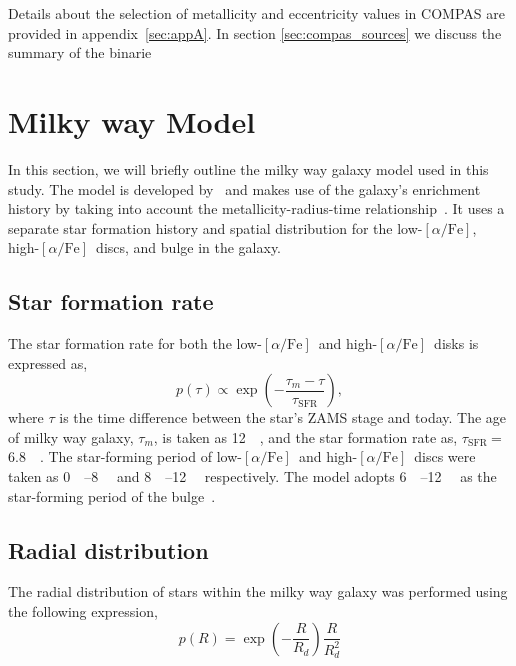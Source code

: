 \documentclass[12pt, journal, onecolumn]{IEEEtran}
\newcommand{\lowalpha}{low-$[\alpha/\text{Fe}]$}
\newcommand{\highalpha}{high-$[\alpha/\text{Fe}]$}
\begin{document}
    Details about the selection of metallicity and eccentricity values in COMPAS are provided in appendix~\ref{sec:appA}. In section \ref{sec:compas_sources} we discuss the summary of the binarie


    \section{Milky way Model}
    \label{sec:milky_way}
    In this section, we will briefly outline the milky way galaxy model used in this study.
    The model is developed by~\cite{wagg2021gravitational} and makes use of the galaxy's enrichment history by taking
    into account the metallicity-radius-time relationship~\cite{Frankel2018}.
    It uses a separate star formation history and spatial distribution for the \lowalpha, \highalpha\ discs, and bulge in the galaxy.

    \subsection{Star formation rate}
    \label{subsec:star_formation_rate}
    The star formation rate for both the \lowalpha\ and \highalpha\ disks is expressed as,
    \begin{equation}
        p(\tau) \propto \exp\left(-\frac{\tau_m - \tau}{\tau_\text{SFR}}\right),
        \label{eq:star_formation_rate_equation}
    \end{equation}
    where $\tau$ is the time difference between the star's ZAMS stage and today.
    The age of milky way galaxy, $\tau_m$, is taken as \SI{12}{\giga\yr}, and the star formation rate as, $\tau_\text{
        SFR}\ $= \SI{6.8}{\giga\yr}.
    The star-forming period of \lowalpha\ and \highalpha\ discs were taken as \SIrange{0}{8}{\giga\yr} and \SIrange{8}{12}{\giga\yr} respectively.
    The model adopts \SIrange{6}{12}{\giga\yr} as the star-forming period of the bulge~\cite{Bovy2019}.

    \subsection{Radial distribution}
    \label{subsec:radial_distribution}
    The radial distribution of stars within the milky way galaxy was performed using the following expression,
    \begin{equation}%
        p(R) = \exp\left(-\frac{R}{R_d}\right)\frac{R}{R_d^2}
        \label{eq:radial_distribution_of_stars}
    \end{equation}%
\end{document}
